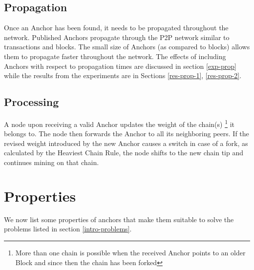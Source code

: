 \subsection{Propagation} \label{anc-prop}

Once an Anchor has been found, it needs to be propagated throughout the network.
Published Anchors propagate through the P2P network similar to transactions and blocks. 
The small size of Anchors (as compared to blocks) allows them to propagate faster throughout the network. 
The effects of including Anchors with respect to propagation times are discussed in section \ref{exp-prop} while the results from the experiments are in Sections \ref{res-prop-1}, \ref{res-prop-2}. 

\subsection{Processing} \label{anc-proc}

A node upon receiving a valid Anchor updates the weight of the chain(s)
\footnote{More than one chain is possible when the received Anchor points to an older Block and since then the chain has been forked} it belongs to. 
The node then forwards the Anchor to all its neighboring peers. 
If the revised weight introduced by the new Anchor causes a switch in case of a fork, as calculated by the Heaviest Chain Rule, the node shifts to the new chain tip and continues mining on that chain.


\section{Properties} \label{anc-properties}

We now list some properties of anchors that make them suitable to solve the problems listed in section \ref{intro-problems}.

